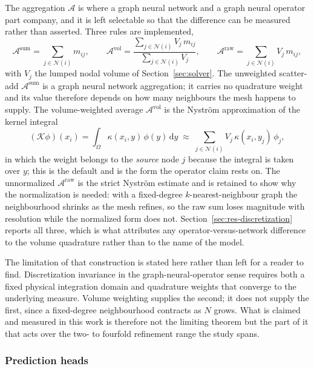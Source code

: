 \documentclass[preprint,12pt]{elsarticle}
\begin{document}
The aggregation $\mathcal{A}$ is where a graph neural network and a graph
neural operator part company, and it is left selectable so that the difference
can be measured rather than asserted. Three rules are implemented,
\begin{equation}
\mathcal{A}^{\mathrm{sum}} = \sum_{j\in\mathcal{N}(i)} m_{ij},
\qquad
\mathcal{A}^{\mathrm{vol}} =
\frac{\sum_{j\in\mathcal{N}(i)} V_j\, m_{ij}}{\sum_{j\in\mathcal{N}(i)} V_j},
\qquad
\mathcal{A}^{\mathrm{raw}} = \sum_{j\in\mathcal{N}(i)} V_j\, m_{ij},
\label{eq:aggregation}
\end{equation}
with $V_j$ the lumped nodal volume of Section~\ref{sec:solver}. The unweighted
scatter-add $\mathcal{A}^{\mathrm{sum}}$ is a graph neural network aggregation;
it carries no quadrature weight and its value therefore depends on how many
neighbours the mesh happens to supply. The volume-weighted average
$\mathcal{A}^{\mathrm{vol}}$ is the Nystr\"om approximation of the kernel
integral
\begin{equation}
(\mathcal{K}\phi)(x_i) = \int_\Omega
\kappa(x_i, y)\,\phi(y)\,\mathrm{d}y
\;\approx\; \sum_{j\in\mathcal{N}(i)} V_j\,\kappa(x_i, y_j)\,\phi_j ,
\label{eq:nystrom}
\end{equation}
in which the weight belongs to the \emph{source} node $j$ because the integral
is taken over $y$; this is the default and is the form the operator claim
rests on. The unnormalized $\mathcal{A}^{\mathrm{raw}}$ is the strict Nystr\"om
estimate and is retained to show why the normalization is needed: with a
fixed-degree $k$-nearest-neighbour graph the neighbourhood shrinks as the mesh
refines, so the raw sum loses magnitude with resolution while the normalized
form does not. Section~\ref{sec:res-discretization} reports all three, which is
what attributes any operator-versus-network difference to the volume quadrature
rather than to the name of the model.

The limitation of that construction is stated here rather than left for a
reader to find. Discretization invariance in the graph-neural-operator sense
requires both a fixed physical integration domain and quadrature weights that
converge to the underlying measure. Volume weighting supplies the second;
it does not supply the first, since a fixed-degree neighbourhood contracts as
$N$ grows. What is claimed and measured in this work is therefore not the
limiting theorem but the part of it that acts over the two- to fourfold
refinement range the study spans.

\subsubsection{Prediction heads}
\label{sec:heads}
\end{document}
